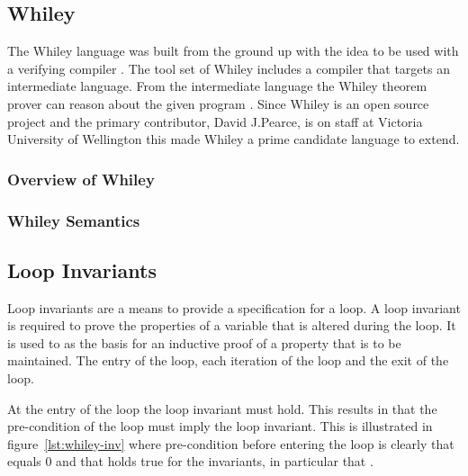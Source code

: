 \subsection{Whiley}

The Whiley language was built from the ground up with the idea to be used with
a verifying compiler \cite{whiley-origin}.
The tool set of Whiley includes a compiler that targets an intermediate
language. From the intermediate language the Whiley theorem prover can reason
about the given program \cite{whiley-design} \cite{whiley-origin}.
Since Whiley is an open source project and the primary contributor, David
J.Pearce, is on staff at Victoria University of Wellington this made Whiley a
prime candidate language to extend.

\subsubsection{Overview of Whiley}

\subsubsection{Whiley Semantics}


\cite{whiley-design}
\cite{whiley-arrays}

\subsection{Loop Invariants}
%

Loop invariants are a means to provide a specification for a loop.
A loop invariant is required to prove the properties of a variable
that is altered during the loop.
It is used to as the basis for an inductive proof of a
property that is to be maintained.
The entry of the loop, each iteration of the loop and the exit of the
loop.

At the entry of the loop the loop invariant must hold.
This results in that the pre-condition of the loop must imply
the loop invariant.
This is illustrated in figure~\ref{lst:whiley-inv} where pre-condition
before entering the loop is clearly that  equals 0 and that holds
true for the invariants, in particular that .


